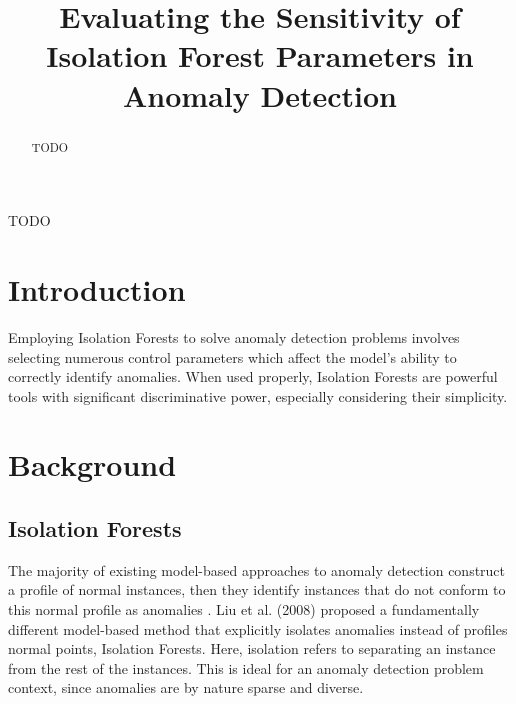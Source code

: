 \documentclass[10pt, conference]{IEEEtran}
\begin{document}
\title{Evaluating the Sensitivity of Isolation Forest Parameters in Anomaly Detection\\

}

\author{
}

\maketitle

\begin{abstract}
TODO
\end{abstract}

\begin{IEEEkeywords}
TODO
\end{IEEEkeywords}

\section{Introduction}
Employing Isolation Forests to solve anomaly detection problems involves selecting numerous control parameters which affect the model's ability to correctly identify anomalies. When used properly, Isolation Forests are powerful tools with significant discriminative power, especially considering their simplicity.





\section{Background}
\subsection{Isolation Forests}
The majority of existing model-based approaches to anomaly detection construct a profile of normal instances, then they identify instances that do not conform to this normal profile as anomalies \cite{iforest}. Liu et al. (2008) proposed a fundamentally different model-based method that explicitly isolates anomalies instead of profiles normal points, Isolation Forests. Here, isolation refers to separating an instance from the rest of the instances. This is ideal for an anomaly detection problem context, since anomalies are by nature sparse and diverse.
\end{document}
